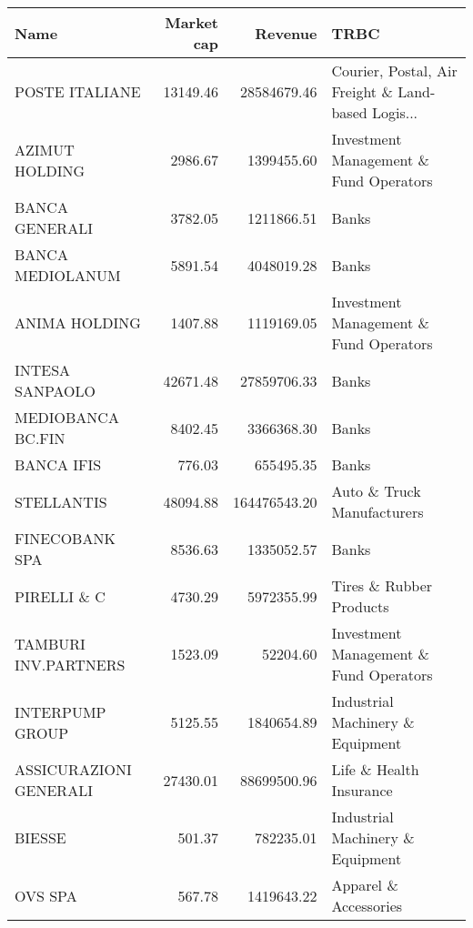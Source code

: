 \begin{tabular}{lrrl}
\toprule
                  Name &  Market cap &      Revenue &                                               TRBC \\
\midrule
        POSTE ITALIANE &    13149.46 &  28584679.46 & Courier, Postal, Air Freight \& Land-based Logis... \\
        AZIMUT HOLDING &     2986.67 &   1399455.60 &             Investment Management \& Fund Operators \\
        BANCA GENERALI &     3782.05 &   1211866.51 &                                              Banks \\
      BANCA MEDIOLANUM &     5891.54 &   4048019.28 &                                              Banks \\
         ANIMA HOLDING &     1407.88 &   1119169.05 &             Investment Management \& Fund Operators \\
       INTESA SANPAOLO &    42671.48 &  27859706.33 &                                              Banks \\
     MEDIOBANCA BC.FIN &     8402.45 &   3366368.30 &                                              Banks \\
            BANCA IFIS &      776.03 &    655495.35 &                                              Banks \\
            STELLANTIS &    48094.88 & 164476543.20 &                         Auto \& Truck Manufacturers \\
        FINECOBANK SPA &     8536.63 &   1335052.57 &                                              Banks \\
           PIRELLI \& C &     4730.29 &   5972355.99 &                            Tires \& Rubber Products \\
  TAMBURI INV.PARTNERS &     1523.09 &     52204.60 &             Investment Management \& Fund Operators \\
       INTERPUMP GROUP &     5125.55 &   1840654.89 &                   Industrial Machinery \& Equipment \\
ASSICURAZIONI GENERALI &    27430.01 &  88699500.96 &                            Life \& Health Insurance \\
                BIESSE &      501.37 &    782235.01 &                   Industrial Machinery \& Equipment \\
               OVS SPA &      567.78 &   1419643.22 &                              Apparel \& Accessories \\

\end{tabular}
